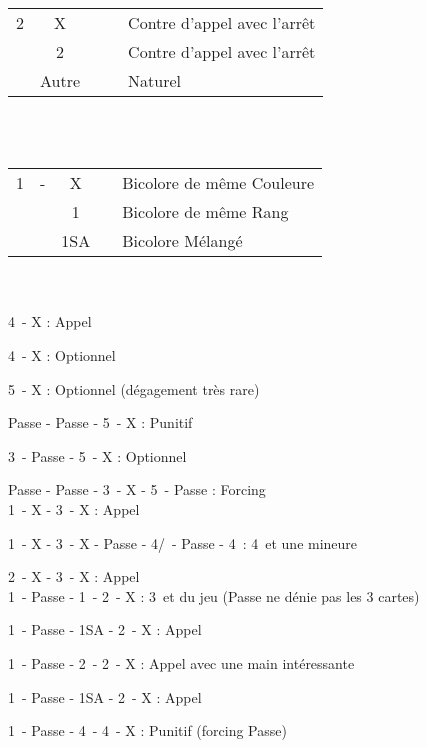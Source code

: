 \documentclass[a4paper, oneside, 11pt]{report}
\begin{document}
	\begin{tabular}{cccc|l}
	2\coeur & X &&& Contre d'appel avec l'arrêt \coeur\\
	& 2\pique &&& Contre d'appel avec l'arrêt \pique\\
	& Autre &&& Naturel\\
	\end{tabular}\\\\

	\begin{tabular}{cccc|l}
	1\trefle & -  & X && Bicolore de même Couleure\\
	&& 1\carreau && Bicolore de même Rang\\
	&& 1SA && Bicolore Mélangé\\
	\end{tabular}\\\\
	
		4\coeur\ - X : Appel
		
		4\pique\ - X : Optionnel
		
		5\trefle\ - X : Optionnel (dégagement très rare)
		
		Passe - Passe - 5\trefle\ - X : Punitif
		
		3\trefle\ - Passe - 5\trefle\ - X : Optionnel
		
		Passe - Passe - 3\trefle\ - X - 5\trefle\ - Passe : Forcing\\
		
		1\pique\ - X - 3\pique\ - X : Appel
		
		1\pique\ - X - 3\pique\ - X - Passe - 4\trefle/\carreau\ - Passe - 4\coeur\ : 4\coeur\ et une mineure
		
		2\pique\ - X - 3\pique\ - X : Appel\\
		
		1\carreau\ - Passe - 1\coeur\ - 2\trefle\ - X : 3\coeur\ et du jeu (Passe ne dénie pas les 3 cartes)
		
		1\pique\ - Passe - 1SA - 2\trefle\ - X : Appel
		
		1\pique\ - Passe - 2\trefle\ - 2\coeur\ - X : Appel avec une main intéressante
		
		1\carreau\ - Passe - 1SA - 2\pique\ - X : Appel
		
		1\coeur\ - Passe - 4\coeur\ - 4\pique\ - X : Punitif (forcing Passe)\\
		
\end{document}
